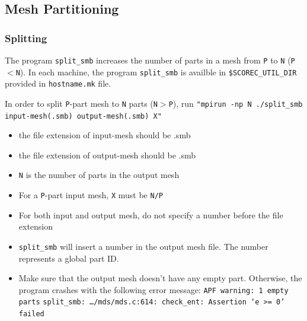 \subsection{Mesh Partitioning}
\label{ch:mesh-ptn}

\subsubsection{Splitting}

The program \texttt{split\_smb} increases the number of parts in a mesh from \texttt{P} to \texttt{N} (\texttt{P$<$N}). 
In each machine, the program \texttt{split\_smb} is availble in \texttt{\$SCOREC\_UTIL\_DIR} provided in \texttt{hostname.mk} file.

In order to split \texttt{P}-part mesh to \texttt{N} parts (\texttt{N$>$P}), run
\texttt{"mpirun -np N ./split\_smb input-mesh(.smb) output-mesh(.smb) X"}
\begin{itemize}
\item	the file extension of input-mesh should be .smb 
\item	the file extension of output-mesh should be .smb
\item	\texttt{N} is the number of parts in the output mesh
\item	For a \texttt{P}-part input mesh, \texttt{X} must be \texttt{N/P}
\item	For both input and output mesh, do not specify a number before the file extension
\item	\texttt{split\_smb} will insert a number in the output mesh file. The number represents a global part ID.
\item	Make sure that the output mesh doesn't have any empty part. Otherwise, the program crashes with the following error message:
\newline
\texttt{APF warning: 1 empty parts}
\newline
\texttt{split\_smb: \ldots/mds/mds.c:614: check\_ent: Assertion `e $>$= 0' failed}
\end{itemize}

